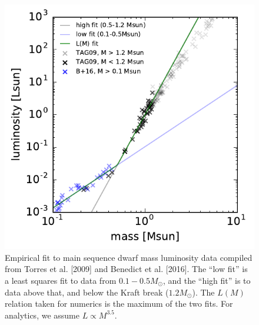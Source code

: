\documentclass{emulateapj}
\begin{document}
\appendix
\begin{figure}[!t]
    \begin{center}
        \includegraphics[scale=0.9]{figures/mass_luminosity.pdf}
    \end{center}
    \caption{Empirical fit to main sequence dwarf mass luminosity data 
    compiled 
        from Torres et al. [2009] and Benedict et al. [2016]. The ``low fit'' 
        is a 
        least squares fit to data from $0.1-0.5M_\odot$, and the ``high fit'' 
        is 
        to 
        data above that, and below the Kraft break ($1.2M_\odot$).
        The $L(M)$ relation taken for numerics is the maximum 
        of the two fits. For analytics, we assume $L\propto M^{3.5}$.
    }
    \label{fig:mass_luminosity}
\end{figure}
\end{document}
